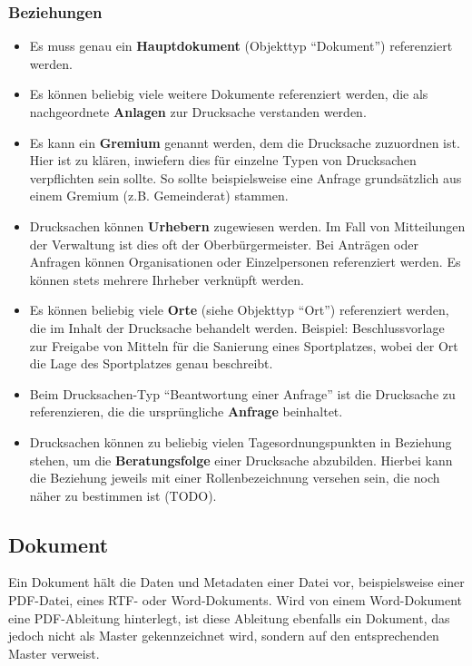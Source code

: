 \documentclass[,a4paper]{article}
\begin{document}
\subsubsection{Beziehungen}

\begin{itemize}
\item
  Es muss genau ein \textbf{Hauptdokument} (Objekttyp ``Dokument'')
  referenziert werden.
\item
  Es können beliebig viele weitere Dokumente referenziert werden, die
  als nachgeordnete \textbf{Anlagen} zur Drucksache verstanden werden.
\item
  Es kann ein \textbf{Gremium} genannt werden, dem die Drucksache
  zuzuordnen ist. Hier ist zu klären, inwiefern dies für einzelne Typen
  von Drucksachen verpflichten sein sollte. So sollte beispielsweise
  eine Anfrage grundsätzlich aus einem Gremium (z.B. Gemeinderat)
  stammen.
\item
  Drucksachen können \textbf{Urhebern} zugewiesen werden. Im Fall von
  Mitteilungen der Verwaltung ist dies oft der Oberbürgermeister. Bei
  Anträgen oder Anfragen können Organisationen oder Einzelpersonen
  referenziert werden. Es können stets mehrere Ihrheber verknüpft
  werden.
\item
  Es können beliebig viele \textbf{Orte} (siehe Objekttyp ``Ort'')
  referenziert werden, die im Inhalt der Drucksache behandelt werden.
  Beispiel: Beschlussvorlage zur Freigabe von Mitteln für die Sanierung
  eines Sportplatzes, wobei der Ort die Lage des Sportplatzes genau
  beschreibt.
\item
  Beim Drucksachen-Typ ``Beantwortung einer Anfrage'' ist die Drucksache
  zu referenzieren, die die ursprüngliche \textbf{Anfrage} beinhaltet.
\item
  Drucksachen können zu beliebig vielen Tagesordnungspunkten in
  Beziehung stehen, um die \textbf{Beratungsfolge} einer Drucksache
  abzubilden. Hierbei kann die Beziehung jeweils mit einer
  Rollenbezeichnung versehen sein, die noch näher zu bestimmen ist
  (TODO).
\end{itemize}

\subsection{Dokument}

Ein Dokument hält die Daten und Metadaten einer Datei vor,
beispielsweise einer PDF-Datei, eines RTF- oder Word-Dokuments. Wird von
einem Word-Dokument eine PDF-Ableitung hinterlegt, ist diese Ableitung
ebenfalls ein Dokument, das jedoch nicht als Master gekennzeichnet wird,
sondern auf den entsprechenden Master verweist.
\end{document}
